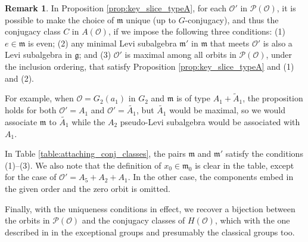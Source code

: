 \documentclass{amsart}
\theoremstyle{definition}
\newtheorem{example}[theorem]{Example}
\newtheorem{remark}[theorem]{Remark}
\newcommand{\cP}{\mathcal{P}}
\newcommand{\frakm}{\mathfrak{m}}
\newcommand{\g}{\mathfrak{g}}
\newcommand{\0}{\mathcal{O}}
\begin{document}


\begin{remark}
In Proposition \ref{prop:key_slice_typeA}, 
for each $\0'$ in $\cP(\0)$, it is possible to make the choice 
of $\frakm$ unique (up to $G$-conjugacy), and thus the conjugacy class $C$ in $A(\0)$, if we impose the following three conditions:  (1) $e \in \frakm$ is even; (2) any minimal Levi subalgebra $\frakm'$ in $\frakm$ that meets $\0'$ is also a Levi subalgebra in $\g$; and (3) $\0'$ is maximal among all orbits in $\cP(\0)$, under the inclusion ordering, that satisfy Proposition \ref{prop:key_slice_typeA} and (1) and (2).  

For example, when $\0 = G_2(a_1)$ in $G_2$ and $\frakm$ is of type $A_1+\tilde{A}_1$, the proposition holds for both $\0'=A_1$  and $\0'=\tilde{A_1}$, but $\tilde{A_1}$ would be maximal, so we would associate $\frakm$ to $\tilde{A_1}$
while the $A_2$ pseudo-Levi subalgebra would be associated with $A_1$.

In Table \ref{table:attaching_conj_classes}, the pairs $\frakm$ and $\frakm'$ satisfy the conditions (1)--(3).  We also note that the definition of $x_0 \in \frakm_0$ is clear in the table, except for the case of $\0'= A_5+A_2+A_1$.  In the other case, the components embed in the given order and the zero orbit is omitted.   

Finally, with the uniqueness conditions in effect,
we recover a bijection between 
the orbits in $\cP(\0)$ and the conjugacy classes of $H(\0)$, 
which with the one described in \cite[Theorem 0.4]{Lusztig:unipotent}
in the exceptional groups and presumably the classical groups too.
\end{remark}
\end{document}
